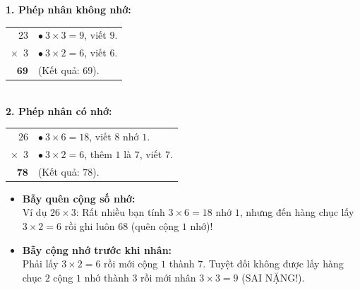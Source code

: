 \documentclass[12pt,a4paper]{article}
\begin{document}
\vspace{-2.5mm}
\noindent
\begin{minipage}[t]{0.49\textwidth}\vspace{0pt}
\begin{tcolorbox}[
  enhanced,
  colback=green!4!white,
  colframe=green!60!black,
  arc=2mm, boxrule=0.8pt,
  left=2mm, right=2mm, top=1.8mm, bottom=1.8mm,
  title={\footnotesize\bfseries\color{white}\faCheckCircle\ Ví dụ thực hành chuẩn mực}
]
{\footnotesize
\textbf{1. Phép nhân không nhớ:}\\
\begin{tabular}{r@{\quad}l}
  $23$ & $\bullet\ 3 \times 3 = 9$, viết $9$.\\
$\times\phantom{0}3$ & $\bullet\ 3 \times 2 = 6$, viết $6$.\\
\cline{1-1}
  $\mathbf{69}$ & (Kết quả: $69$).
\end{tabular}\\[1mm]
\textbf{2. Phép nhân có nhớ:}\\
\begin{tabular}{r@{\quad}l}
  $26$ & $\bullet\ 3 \times 6 = 18$, viết $8$ nhớ $1$.\\
$\times\phantom{0}3$ & $\bullet\ 3 \times 2 = 6$, thêm $1$ là $7$, viết $7$.\\
\cline{1-1}
  $\mathbf{78}$ & (Kết quả: $78$).
\end{tabular}
}
\end{tcolorbox}
\end{minipage}
\hfill
\begin{minipage}[t]{0.49\textwidth}\vspace{0pt}
\begin{tcolorbox}[
  enhanced,
  colback=red!4!white,
  colframe=red!70!black,
  arc=2mm, boxrule=0.8pt,
  left=2mm, right=2mm, top=1.8mm, bottom=1.8mm,
  title={\footnotesize\bfseries\color{white}\faExclamationTriangle\ Mẹo tránh bẫy trắc nghiệm}
]
{\footnotesize
\begin{itemize}\setlength{\itemsep}{1.5pt}\setlength{\leftskip}{-2.5mm}
  \item \textbf{Bẫy quên cộng số nhớ:}\\
  Ví dụ $26 \times 3$: Rất nhiều bạn tính $3 \times 6 = 18$ nhớ $1$, nhưng đến hàng chục lấy $3 \times 2 = 6$ rồi ghi luôn $68$ (quên cộng $1$ nhớ)!
  \item \textbf{Bẫy cộng nhớ trước khi nhân:}\\
  Phải lấy $3 \times 2 = 6$ rồi mới cộng $1$ thành $7$. Tuyệt đối không được lấy hàng chục $2$ cộng $1$ nhớ thành $3$ rồi mới nhân $3 \times 3 = 9$ (SAI NẶNG!).
\end{itemize}
}
\end{tcolorbox}
\end{minipage}
\end{document}
